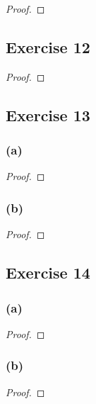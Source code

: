 \documentclass[14pt]{extarticle}
\begin{document}
\begin{proof}

\end{proof}

\subsection{Exercise 12}

\begin{proof}

\end{proof}

\subsection{Exercise 13}

\subsubsection{(a)}

\begin{proof}

\end{proof}

\subsubsection{(b)}

\begin{proof}

\end{proof}

\subsection{Exercise 14}

\subsubsection{(a)}

\begin{proof}

\end{proof}

\subsubsection{(b)}

\begin{proof}

\end{proof}
\end{document}

